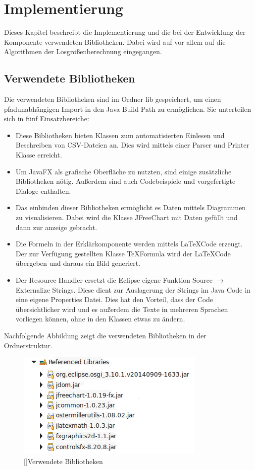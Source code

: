 \documentclass[12pt,a4paper, listof=entryprefix, bibliography=totocnumbered,toc=listofnumbered,lof=listofnumbered]{scrartcl}
\begin{document}

\section{Implementierung}
Dieses Kapitel beschreibt die Implementierung und die bei der Entwicklung der Komponente verwendeten Bibliotheken. Dabei wird auf vor allem auf die Algorithmen der Losgrößenberechnung eingegangen.
 
\subsection{Verwendete Bibliotheken}
Die verwendeten Bibliotheken sind im Ordner lib gespeichert, um einen pfadunabhängigen Import in den Java Build Path zu ermöglichen. Sie unterteilen sich in fünf Einsatzbereiche:
\begin{itemize}
	\item[CSV-Import:] Diese Bibliotheken bieten Klassen zum automatisierten Einlesen und Beschreiben von \gls{CSV}-Dateien an. Dies wird mittels einer Parser und Printer Klasse erreicht.
	\item[JavaFX:] Um JavaFX als grafische Oberfläche zu nutzten, sind einige zusätzliche Bibliotheken nötig. Außerdem sind auch Codebeispiele und vorgefertigte Dialoge enthalten.
	\item[JFreeChart:] Das einbinden dieser Bibliotheken ermöglicht es Daten mittels Diagrammen zu visualisieren. Dabei wird die Klasse JFreeChart mit Daten gefüllt und dann zur anzeige gebracht.
	\item[\LaTeX :] Die Formeln in der Erklärkomponente werden mittels \LaTeX Code erzeugt. Der zur Verfügung gestellten Klasse TeXFormula wird der \LaTeX Code übergeben und daraus ein Bild generiert.
	\item[Resource Handler:] Der Resource Handler ersetzt die Eclipse eigene Funktion Source $\rightarrow$ Externalize Strings. Diese dient zur Auslagerung der Strings im Java Code in eine eigene Properties Datei. Dies hat den Vorteil, dass der Code übersichtlicher wird und es außerdem die Texte in mehreren Sprachen vorliegen können, ohne in den Klassen etwas zu ändern.
\end{itemize}

Nachfolgende Abbildung zeigt die verwendeten Bibliotheken in der Ordnerstruktur.
\begin{figure}[H]
	\centering
	\includegraphics[]{Bilder/libraries} 
	[]{Verwendete Bibliotheken}
	\label{fig:osgi}
\end{figure}
\end{document}
